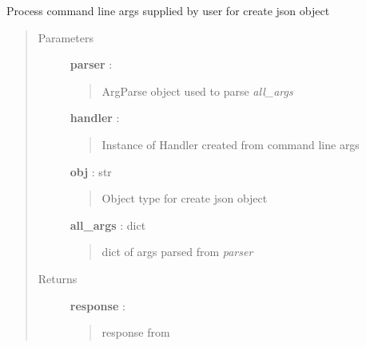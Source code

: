 \documentclass[letterpaper,10pt,english]{sphinxmanual}
\begin{document}
\begin{fulllineitems}
\label{pytan.utils:pytan.utils.process_create_json_object_args}
Process command line args supplied by user for create json object
\begin{quote}\begin{description}
\item[{Parameters}] \leavevmode
\textbf{parser} : 
\begin{quote}

ArgParse object used to parse \emph{all\_args}
\end{quote}

\textbf{handler} : {\hyperref[pytan.handler:pytan.handler.Handler]{}}
\begin{quote}

Instance of Handler created from command line args
\end{quote}

\textbf{obj} : str
\begin{quote}

Object type for create json object
\end{quote}

\textbf{all\_args} : dict
\begin{quote}

dict of args parsed from \emph{parser}
\end{quote}

\item[{Returns}] \leavevmode
\textbf{response} : {\hyperref[taniumpy.object_types:taniumpy.object_types.base.BaseType]{}}
\begin{quote}

response from {\hyperref[pytan.handler:pytan.handler.Handler.create_from_json]{}}
\end{quote}

\end{description}\end{quote}

\end{fulllineitems}

\end{document}
